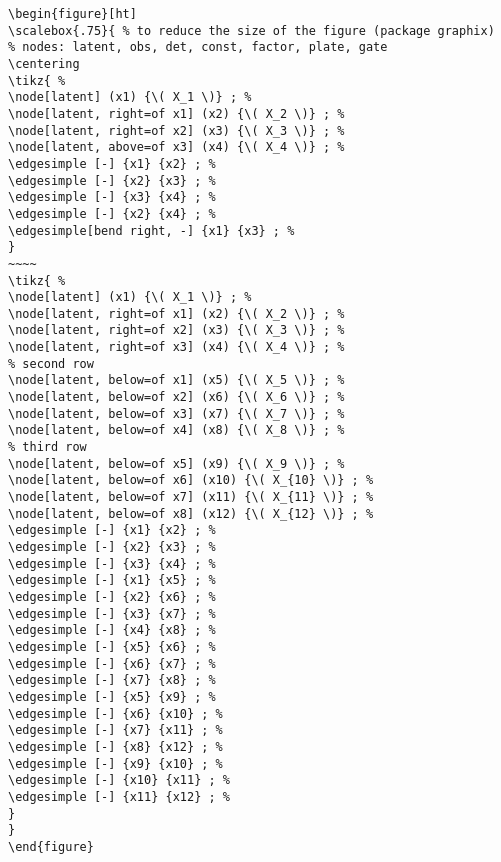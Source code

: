 \documentclass[a4paper]{article}
\begin{document}
\lstset{numbers=left,language=[LaTeX]TeX,label= ,caption= ,captionpos=b}
\begin{lstlisting}
\begin{figure}[ht]
\scalebox{.75}{ % to reduce the size of the figure (package graphix)
% nodes: latent, obs, det, const, factor, plate, gate
\centering
\tikz{ %
\node[latent] (x1) {\( X_1 \)} ; %
\node[latent, right=of x1] (x2) {\( X_2 \)} ; %
\node[latent, right=of x2] (x3) {\( X_3 \)} ; %
\node[latent, above=of x3] (x4) {\( X_4 \)} ; %
\edgesimple [-] {x1} {x2} ; %
\edgesimple [-] {x2} {x3} ; %
\edgesimple [-] {x3} {x4} ; %
\edgesimple [-] {x2} {x4} ; %
\edgesimple[bend right, -] {x1} {x3} ; %
}
~~~~
\tikz{ %
\node[latent] (x1) {\( X_1 \)} ; %
\node[latent, right=of x1] (x2) {\( X_2 \)} ; %
\node[latent, right=of x2] (x3) {\( X_3 \)} ; %
\node[latent, right=of x3] (x4) {\( X_4 \)} ; %
% second row
\node[latent, below=of x1] (x5) {\( X_5 \)} ; %
\node[latent, below=of x2] (x6) {\( X_6 \)} ; %
\node[latent, below=of x3] (x7) {\( X_7 \)} ; %
\node[latent, below=of x4] (x8) {\( X_8 \)} ; %
% third row
\node[latent, below=of x5] (x9) {\( X_9 \)} ; %
\node[latent, below=of x6] (x10) {\( X_{10} \)} ; %
\node[latent, below=of x7] (x11) {\( X_{11} \)} ; %
\node[latent, below=of x8] (x12) {\( X_{12} \)} ; %
\edgesimple [-] {x1} {x2} ; %
\edgesimple [-] {x2} {x3} ; %
\edgesimple [-] {x3} {x4} ; %
\edgesimple [-] {x1} {x5} ; %
\edgesimple [-] {x2} {x6} ; %
\edgesimple [-] {x3} {x7} ; %
\edgesimple [-] {x4} {x8} ; %
\edgesimple [-] {x5} {x6} ; %
\edgesimple [-] {x6} {x7} ; %
\edgesimple [-] {x7} {x8} ; %
\edgesimple [-] {x5} {x9} ; %
\edgesimple [-] {x6} {x10} ; %
\edgesimple [-] {x7} {x11} ; %
\edgesimple [-] {x8} {x12} ; %
\edgesimple [-] {x9} {x10} ; %
\edgesimple [-] {x10} {x11} ; %
\edgesimple [-] {x11} {x12} ; %
}
}
\end{figure}
\end{lstlisting}
\end{document}
